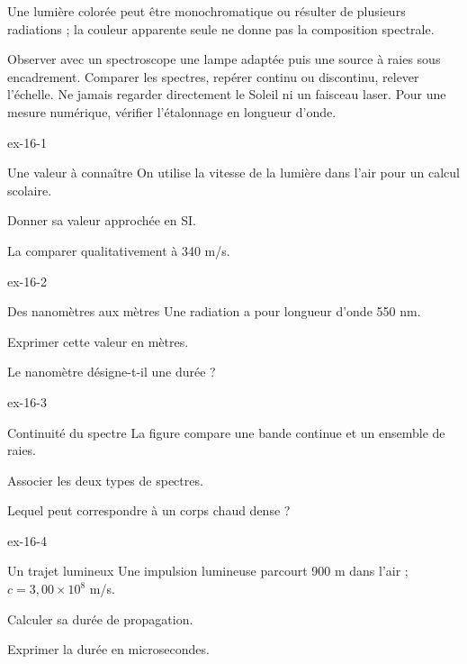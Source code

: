 Une lumière colorée peut être monochromatique ou résulter de plusieurs radiations ; la couleur apparente seule ne donne pas la composition spectrale.
\begin{experience}Observer avec un spectroscope une lampe adaptée puis une source à raies sous encadrement. Comparer les spectres, repérer continu ou discontinu, relever l'échelle. Ne jamais regarder directement le Soleil ni un faisceau laser. Pour une mesure numérique, vérifier l'étalonnage en longueur d'onde.\end{experience}
\exercices
{}
\begin{blocLivre}{ex-16-1}\begin{exercice}[1]{Une valeur à connaître}
On utilise la vitesse de la lumière dans l’air pour un calcul scolaire.
\begin{questions}
\item Donner sa valeur approchée en SI.
\item La comparer qualitativement à 340 m/s.
\end{questions}
\end{exercice}\end{blocLivre}
\begin{blocLivre}{ex-16-2}\begin{exercice}[1]{Des nanomètres aux mètres}
Une radiation a pour longueur d’onde 550 nm.
\begin{questions}
\item Exprimer cette valeur en mètres.
\item Le nanomètre désigne-t-il une durée ?
\end{questions}
\end{exercice}\end{blocLivre}
\begin{blocLivre}{ex-16-3}\begin{exercice}[1]{Continuité du spectre}
La figure compare une bande continue et un ensemble de raies.
\begin{questions}
\item Associer les deux types de spectres.
\item Lequel peut correspondre à un corps chaud dense ?
\end{questions}
\end{exercice}\end{blocLivre}
\begin{blocLivre}{ex-16-4}\begin{exercice}[1]{Un trajet lumineux}
Une impulsion lumineuse parcourt 900 m dans l’air ; $c=3,00\times10^8$ m/s.
\begin{questions}
\item Calculer sa durée de propagation.
\item Exprimer la durée en microsecondes.
\end{questions}
\end{exercice}\end{blocLivre}
